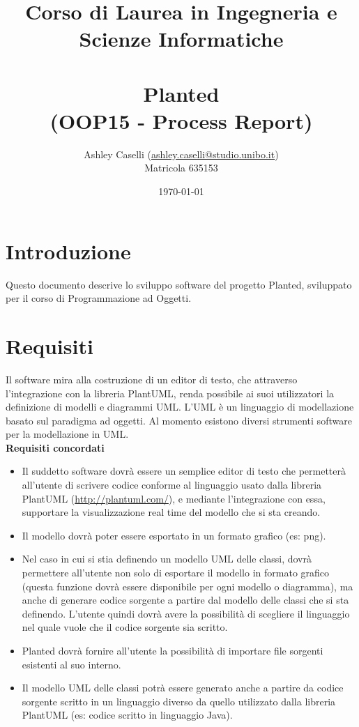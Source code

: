 \documentclass{article}
\title{Corso di Laurea in Ingegneria e Scienze Informatiche\\\textbf{\newline\\Planted}\\{(OOP15 - Process Report)}}
\date{\today}
\author{Ashley Caselli (\href{mailto:ashley.caselli@studio.unibo.it}{ashley.caselli@studio.unibo.it})\\Matricola 635153}
\begin{document}
  \maketitle
  \newpage
  \tableofcontents
  \newpage
  \section{Introduzione}
  Questo documento descrive lo sviluppo software del progetto Planted, sviluppato per il corso di Programmazione ad Oggetti.
  \section{Requisiti}
  Il software mira alla costruzione di un editor di testo, che attraverso l'integrazione con la libreria PlantUML, renda possibile ai suoi utilizzatori
  la definizione di modelli e diagrammi UML.
  L’UML è un linguaggio di modellazione basato sul paradigma ad oggetti. Al momento esistono diversi strumenti software per la modellazione in UML.\\[0.3in]
  {\large \textbf{Requisiti concordati}}
  \begin{itemize}
    \item Il suddetto software dovrà essere un semplice editor di testo che permetterà all'utente di scrivere codice conforme al linguaggio usato
      dalla libreria PlantUML (\url{http://plantuml.com/}), e mediante l'integrazione con essa, supportare la visualizzazione real time del modello che si sta creando.
    \item Il modello dovrà poter essere esportato in un formato grafico (es: png).
    \item Nel caso in cui si stia definendo un modello UML delle classi, dovrà permettere all'utente non solo di esportare il modello
      in formato grafico (questa funzione dovrà essere disponibile per ogni modello o diagramma), ma anche di generare codice
      sorgente a partire dal modello delle classi che si sta definendo. L'utente quindi dovrà avere la possibilità di scegliere il linguaggio nel quale vuole
      che il codice sorgente sia scritto.
    \item Planted dovrà fornire all'utente la possibilità di importare file sorgenti esistenti al suo interno.
    \item Il modello UML delle classi potrà essere generato anche a partire da codice sorgente scritto in un linguaggio diverso da quello
      utilizzato dalla libreria PlantUML (es: codice scritto in linguaggio Java).
  \end{itemize}
\end{document}
